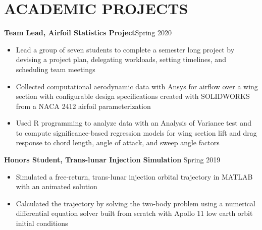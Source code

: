 \documentclass{article}
\begin{document}
\section{ACADEMIC PROJECTS}

\textbf{Team Lead, Airfoil Statistics Project}\hfill Spring 2020
\vspace{0.5em}
\begin{itemize}
	\item Lead a group of seven students to complete a semester long project by devising a project plan, delegating workloads, setting timelines, and scheduling team meetings
	\item Collected computational aerodynamic data with Ansys for airflow over a wing section with configurable design specifications created with SOLIDWORKS from a NACA 2412 airfoil parameterization
	\item Used R programming to analyze data with an Analysis of Variance test and to compute significance-based regression models for wing section lift and drag response to chord length, angle of attack, and sweep angle factors
\end{itemize}
\vspace{0.5em}
\textbf{Honors Student, Trans-lunar Injection Simulation} 
\hfill
Spring 2019
\vspace{0.5em}
\begin{itemize}
	\item Simulated a free-return, trans-lunar injection orbital trajectory in MATLAB with an animated solution
	\item Calculated the trajectory by solving the two-body problem using a numerical differential equation solver built from scratch with Apollo 11 low earth orbit initial conditions
\end{itemize}

\thispagestyle{empty}
\end{document}
